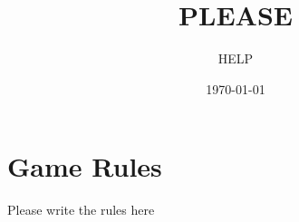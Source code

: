 \documentclass{article}%
\title{PLEASE}%
\author{HELP}%
\date{\today}%
\begin{document}
%
\normalsize%
\maketitle%
\section{Game Rules}%
\label{sec:GameRules}%
Please write the rules here

%
\end{document}

